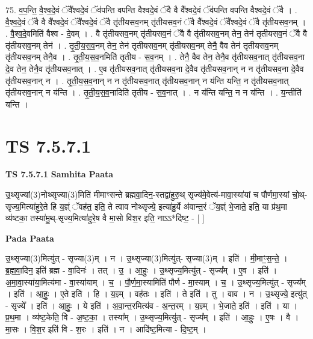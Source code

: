 \documentclass[17pt]{extarticle}
\begin{document}
75. व॒प॒न्ति॒ वै॒श्व॒दे॒वं ॅवै᳚श्वदे॒वं ॅव॑पन्ति वपन्ति वैश्वदे॒वं ॅवै वै वै᳚श्वदे॒वं ॅव॑पन्ति वपन्ति वैश्वदे॒वं ॅवै । . वै॒श्व॒दे॒वं ॅवै वै वै᳚श्वदे॒वं ॅवै᳚श्वदे॒वं ॅवै तृ॑तीयसव॒नम् तृ॑तीयसव॒नं ॅवै वै᳚श्वदे॒वं ॅवै᳚श्वदे॒वं ॅवै तृ॑तीयसव॒नम् । . वै॒श्व॒दे॒वमिति॑ वैश्व - दे॒वम् । . वै तृ॑तीयसव॒नम् तृ॑तीयसव॒नं ॅवै वै तृ॑तीयसव॒नम् तेन॒ तेन॑ तृतीयसव॒नं ॅवै वै तृ॑तीयसव॒नम् तेन॑ । . तृ॒ती॒य॒स॒व॒नम् तेन॒ तेन॑ तृतीयसव॒नम् तृ॑तीयसव॒नम् तेनै॒ वैव तेन॑ तृतीयसव॒नम् तृ॑तीयसव॒नम् तेनै॒व । . तृ॒ती॒य॒स॒व॒नमिति॑ तृतीय - स॒व॒नम् । . तेनै॒ वैव तेन॒ तेनै॒व तृ॑तीयसव॒नात् तृ॑तीयसव॒ना दे॒व तेन॒ तेनै॒व तृ॑तीयसव॒नात् । . ए॒व तृ॑तीयसव॒नात् तृ॑तीयसव॒ना दे॒वैव तृ॑तीयसव॒नान् न न तृ॑तीयसव॒ना दे॒वैव तृ॑तीयसव॒नान् न । . तृ॒ती॒य॒स॒व॒नान् न न तृ॑तीयसव॒नात् तृ॑तीयसव॒नान् न य॑न्ति यन्ति॒ न तृ॑तीयसव॒नात् तृ॑तीयसव॒नान् न य॑न्ति । . तृ॒ती॒य॒स॒व॒नादिति॑ तृतीय - स॒व॒नात् । . न य॑न्ति यन्ति॒ न न य॑न्ति । . य॒न्तीति॑ यन्ति । \newline
\pagebreak
{}

\section{ TS 7.5.7.1 }

\textbf{TS 7.5.7.1 } \newline
\textbf{Samhita Paata} \newline

उ॒थ्सृज्यां(3)नोथ्सृज्या(3)मिति॑ मीमाꣳसन्ते ब्रह्मवा॒दिन॒-स्तद्वा॑हुरु॒थ् सृज्य॑मे॒वेत्य॑-मावा॒स्या॑यां च पौर्णमा॒स्यां चो॒थ्-सृज्य॒मित्या॑हुरे॒ते हि य॒ज्ञ्ं ॅवह॑त॒ इति॒ ते त्वाव नोथ्सृज्ये॒ इत्या॑हु॒र्ये अ॑वान्त॒रं ॅय॒ज्ञ्ं भे॒जाते॒ इति॒ या प्र॑थ॒मा व्य॑ष्टका॒ तस्या॑मु॒थ्-सृज्य॒मित्या॑हुरे॒ष वै मा॒सो वि॑श॒र इति॒ नाऽऽ*दि॑ष्ट॒ - [  ] \newline

\textbf{Pada Paata} \newline

उ॒थ्सृज्या(3)मित्यु॑त् - सृज्या(3)म् । न । उ॒थ्सृज्या(3)मित्यु॑त्- सृज्या(3)म् । इति॑ । मी॒माꣳ॒॒स॒न्ते॒ । ब्र॒ह्म॒वा॒दिन॒ इति॑ ब्रह्म - वा॒दिनः॑ । तत् । उ॒ । आ॒हुः॒ । उ॒थ्सृज्य॒मित्यु॑त् - सृज्य᳚म् । ए॒व । इति॑ । अ॒मा॒वा॒स्या॑या॒मित्य॑मा - वा॒स्या॑याम् । च॒ । पौ॒र्ण॒मा॒स्यामिति॑ पौर्ण - मा॒स्याम् । च॒ । उ॒थ्सृज्य॒मित्यु॑त् - सृज्य᳚म् । इति॑ । आ॒हुः॒ । ए॒ते इति॑ । हि । य॒ज्ञ्म् । वह॑तः । इति॑ । ते इति॑ । तु । वाव । न । उ॒थ्सृज्ये॒ इत्यु॑त् - सृज्ये᳚ । इति॑ । आ॒हुः॒ । ये इति॑ । अ॒वा॒न्त॒रमित्य॑व - अ॒न्त॒रम् । य॒ज्ञ्म् । भे॒जाते॒ इति॑ । इति॑ । या । प्र॒थ॒मा । व्य॑ष्ट॒केति॒ वि - अ॒ष्ट॒का॒ । तस्या᳚म् । उ॒थ्सृज्य॒मित्यु॑त् - सृज्य᳚म् । इति॑ । आ॒हुः॒ । ए॒षः । वै । मा॒सः । वि॒श॒र इति॑ वि - श॒रः । इति॑ । न । आदि॑ष्ट॒मित्या - दि॒ष्ट॒म् ।  \newline
\end{document}
